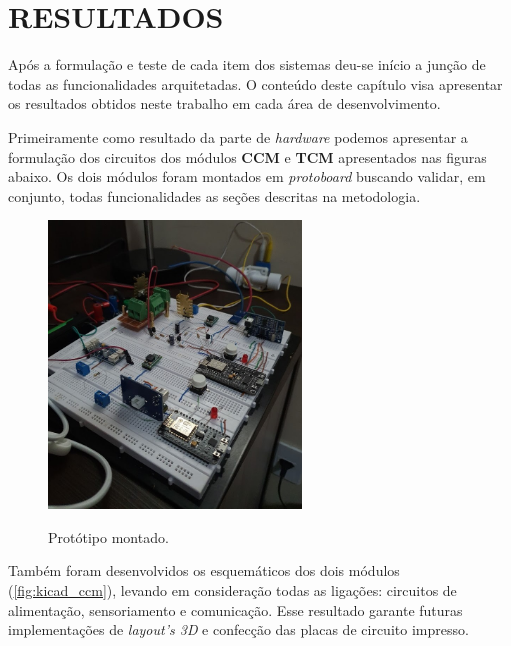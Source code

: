 
\chapter{RESULTADOS}
\label{chap:resultados}


Após a formulação e teste de cada item dos sistemas deu-se início a junção de todas as funcionalidades arquitetadas. O conteúdo deste capítulo visa apresentar os resultados obtidos neste trabalho em cada área de desenvolvimento.

Primeiramente como resultado da parte de \textit{hardware} podemos apresentar a formulação dos circuitos dos módulos \textbf{CCM} e \textbf{TCM} apresentados nas figuras abaixo. Os dois módulos foram montados em \textit{protoboard} buscando validar, em conjunto, todas funcionalidades as seções descritas na metodologia.


\begin{figure}[H]
	\centering
	\caption{Protótipo montado.}
	\includegraphics[width=0.6\textwidth]{figuras/esquema_protoboard.jpg}
	\label{fig:figma_plan_desktop}
\end{figure}

Também foram desenvolvidos os esquemáticos dos dois módulos (\autoref{fig:kicad_ccm}), levando em consideração todas as ligações: circuitos de alimentação, sensoriamento e comunicação. Esse resultado garante futuras implementações de \textit{layout's 3D} e confecção das placas de circuito impresso.


